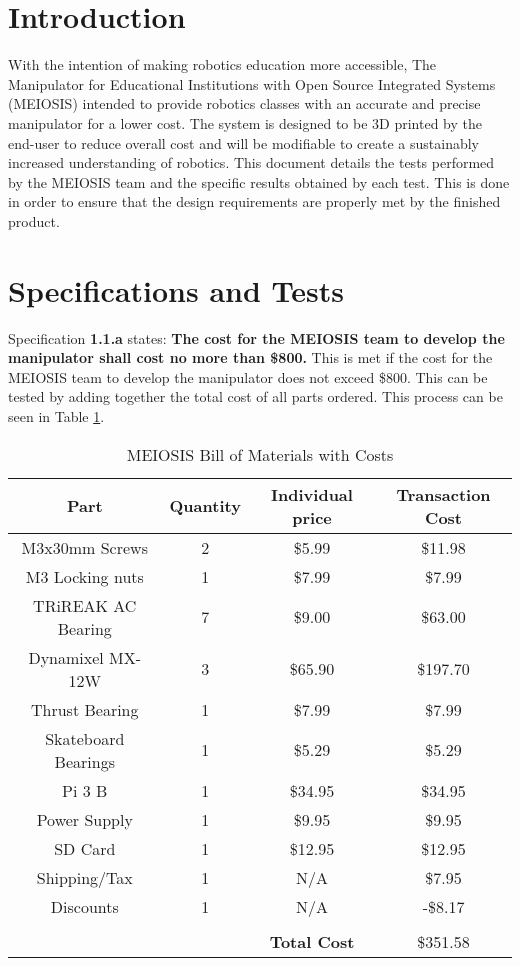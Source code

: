 

\normalem

{\tableofcontents\let\clearpage\relax\listoffigures}
\clearpage
\newpage
{}
\raggedright
\section{Introduction}\label{sec:intro}

With the intention of making robotics education more accessible, The Manipulator for Educational Institutions with Open Source Integrated Systems (MEIOSIS) intended to provide robotics classes with an accurate and precise manipulator for a lower cost. The system is designed to be 3D printed by the end-user to reduce overall cost and will be modifiable to create a sustainably increased understanding of robotics. This document details the tests performed by the MEIOSIS team and the specific results obtained by each test. This is done in order to ensure that the design requirements are properly met by the finished product.


\section{Specifications and Tests}\label{sec:tests}
Specification \textbf{1.1.a} states: \textbf{The cost for the MEIOSIS team to develop the manipulator shall cost no more than \$800.} This is met if the cost for the MEIOSIS team to develop the manipulator does not exceed \$800. This can be tested by adding together the total cost of all parts ordered. This process can be seen in Table \ref{tab:bom}.

\begin{table}[htp]
  \centering
  \caption{MEIOSIS Bill of Materials with Costs}
  \label{tab:bom}
  \begin{tabular}{c|c|c|c}
  Part & Quantity & Individual price & Transaction Cost \\\hline
  M3x30mm Screws & 2 & \$5.99 & \$11.98 \\
  M3 Locking nuts & 1 & \$7.99 & \$7.99 \\
  TRiREAK AC Bearing & 7 & \$9.00 & \$63.00 \\
  Dynamixel MX-12W & 3 & \$65.90 & \$197.70 \\
  Thrust Bearing & 1 & \$7.99 & \$7.99 \\
  Skateboard Bearings & 1 & \$5.29 & \$5.29 \\
  Pi 3 B & 1 & \$34.95 & \$34.95 \\
  Power Supply & 1 & \$9.95 & \$9.95 \\
  SD Card & 1 & \$12.95 & \$12.95 \\
  Shipping/Tax & 1 & N/A & \$7.95 \\
  Discounts & 1 & N/A & -\$8.17 \\
  &&&\\
  & & \textbf{Total Cost} & \$351.58 \\
  \end{tabular}
\end{table}

